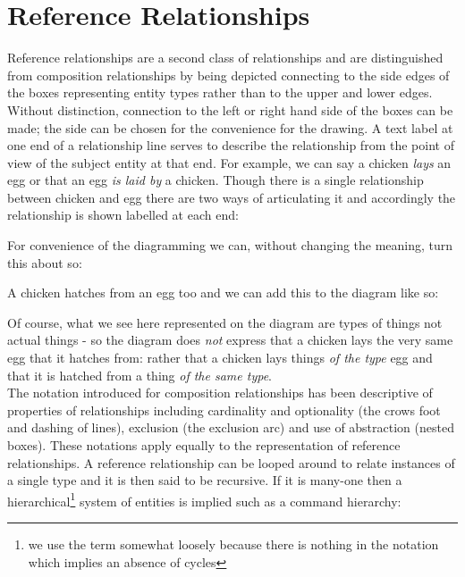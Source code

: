 

\section {Reference Relationships}

Reference relationships are a second class of relationships and are distinguished from composition relationships by being depicted connecting to the side edges of the boxes representing entity types rather than to the upper and lower edges. Without distinction, connection to the left or right hand side of the boxes can be made; the side can be chosen for the convenience for the drawing.  
A text label at one end of a relationship line serves to describe the relationship from the point of view of the subject entity at that end.
For example, we can say a chicken \emph{lays} an egg or that an egg \emph{is laid by} a chicken. Though there is a single relationship between chicken and egg there are two ways of articulating it and accordingly the relationship is shown labelled at each end: \\

For convenience of the diagramming we can, without changing the meaning, turn this about so: \\


\noindent A chicken hatches from an egg too and we can add this to the diagram like so: \\


\noindent Of course, what we see here represented on the diagram are types of things not actual things - so the diagram does \emph{not} express that a chicken lays the very same egg that it hatches from: rather that a chicken lays things \emph{of the type} egg and that it is hatched from a thing \emph{of the same type}.\\


\noindent The notation introduced for composition relationships has been descriptive of properties of relationships including cardinality and optionality (the crows foot and dashing of lines), exclusion (the exclusion arc) and use of abstraction (nested boxes). These notations apply equally to the representation of reference relationships. A reference relationship can be looped around to relate instances of a single type and it is then said to be recursive. If it is many-one then a hierarchical\footnote{we use the term somewhat loosely because there is nothing in the notation which implies an absence of cycles} system of entities is implied 
such as a command hierarchy:\\

